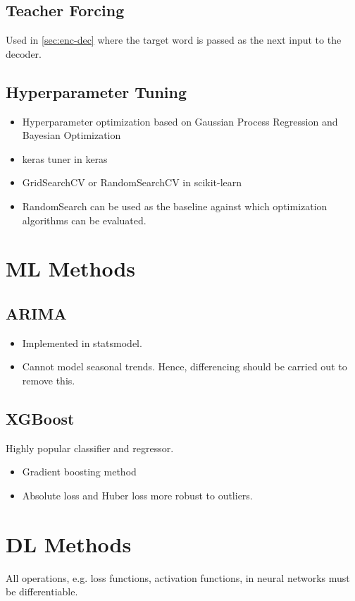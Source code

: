 \documentclass[a4paper, 12pt]{report}
\begin{document}
\section{Teacher Forcing}
Used in  \autoref{sec:enc-dec} where the target word is passed as the next input to the decoder.

\section{Hyperparameter Tuning}
\begin{itemize}
\item Hyperparameter optimization based on Gaussian Process Regression and Bayesian Optimization
\item keras tuner in keras
\item GridSearchCV or RandomSearchCV in scikit-learn
\item RandomSearch can be used as the baseline against which optimization algorithms can be evaluated.
\end{itemize}

\chapter{ML Methods}

\section{ARIMA}
\begin{itemize}
\item Implemented in statsmodel.
\item Cannot model seasonal trends. Hence, differencing should be carried out to remove this.
\end{itemize}

\section{XGBoost}
Highly popular classifier and regressor. 
\begin{itemize}
\item Gradient boosting method
\item Absolute loss and Huber loss more robust to outliers.
\end{itemize}



\chapter{DL Methods}
All operations, e.g. loss functions, activation functions, in neural networks must be differentiable.
\end{document}
